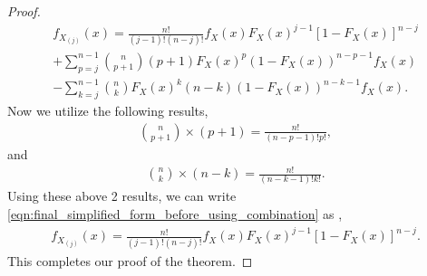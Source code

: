 \documentclass[a4paper,english,12pt]{article}
\begin{document}
\begin{proof}
\begin{align}
f_{X_{(j)}} (x)=\frac{n!}{(j-1)!(n-j)!} f_X (x) F_X (x) ^{j-1} [1 - F_X (x)]^{n-j}\nonumber \\ + {\sum\limits_{p=j}^{n-1}} \binom{n}{p+1} (p+1) F_X (x) ^{p} (1-F_X (x))^{n-p-1}f_X (x)\nonumber \\-{\sum\limits_{k=j}^{n-1}} \binom{n}{k} F_X (x) ^{k} (n-k) (1-F_X (x))^{n-k-1} f_X (x).
\end{align}
Now we utilize the following results,
\begin{align}
\binom{n}{p+1}\times (p+1)=\frac{n!}{(n-p-1)!p!}, \nonumber 
\end{align}
and
\begin{align}
\binom{n}{k}\times (n-k)=\frac{n!}{(n-k-1)!k!}. \nonumber 
\end{align}
Using these above 2 results, we can write \eqref{eqn:final_simplified_form_before_using_combination} as ,
\begin{align}
f_{X_{(j)}} (x)=\frac{n!}{(j-1)!(n-j)!} f_X (x) F_X (x) ^{j-1} [1 - F_X (x)]^{n-j}.
\end{align}
This completes our proof of the theorem.
\end{proof}
\end{document}

